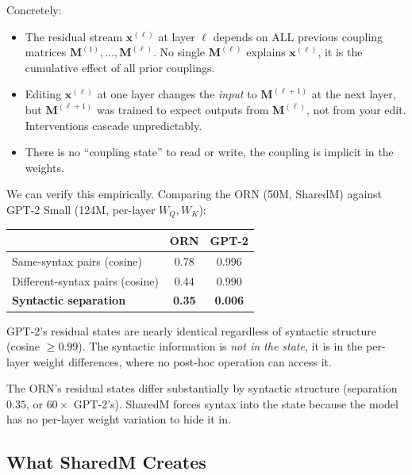 \documentclass[11pt, a4paper]{article}
\newcommand{\M}{\mathbf{M}}
\newcommand{\x}{\mathbf{x}}
\theoremstyle{plain}
\theoremstyle{definition}
\theoremstyle{remark}
\begin{document}
Concretely:
\begin{itemize}[nosep]
\item The residual stream $\x^{(\ell)}$ at layer $\ell$ depends on ALL previous coupling matrices $\M^{(1)}, \ldots, \M^{(\ell)}$.
    No single $\M^{(\ell)}$ explains $\x^{(\ell)}$, it is the cumulative effect of all prior couplings.
\item Editing $\x^{(\ell)}$ at one layer changes the \emph{input} to $\M^{(\ell+1)}$ at the next layer, but $\M^{(\ell+1)}$ was trained to expect outputs from $\M^{(\ell)}$, not from your edit.
    Interventions cascade unpredictably.
\item There is no ``coupling state'' to read or write, the coupling is implicit in the weights.
\end{itemize}

We can verify this empirically.
Comparing the ORN (50M, SharedM) against GPT-2 Small (124M, per-layer $W_Q, W_K$):

\begin{center}\small
\begin{tabular}{lcc}
\toprule
& \textbf{ORN} & \textbf{GPT-2} \\
\midrule
Same-syntax pairs (cosine) & 0.78 & 0.996 \\
Different-syntax pairs (cosine) & 0.44 & 0.990 \\
\textbf{Syntactic separation} & \textbf{0.35} & \textbf{0.006} \\
\bottomrule
\end{tabular}
\end{center}

GPT-2's residual states are nearly identical regardless of syntactic structure (cosine $\geq 0.99$).
The syntactic information is \emph{not in the state}, it is in the per-layer weight differences, where no post-hoc operation can access it.

The ORN's residual states differ substantially by syntactic structure (separation $0.35$, or $60\times$ GPT-2's).
SharedM forces syntax into the state because the model has no per-layer weight variation to hide it in.

\subsection{What SharedM Creates}
\end{document}
